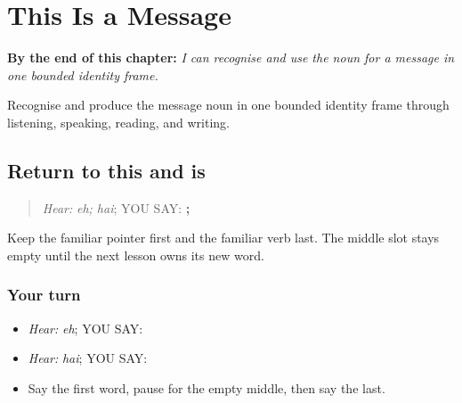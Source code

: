 
\chapter{This Is a Message}
\label{ch:pa-a2-suneha}

\begin{chapteropening}
\textbf{By the end of this chapter:} \emph{I can recognise and use the noun for a message in one bounded identity frame.}

Recognise and produce the message noun in one bounded identity frame through listening, speaking, reading, and writing.
\end{chapteropening}

\section[\texorpdfstring{\pa{ਇਹ} · \pa{ਹੈ} (eh; hai)}{ਇਹ · ਹੈ (eh; hai)}]{Return to this and is}

\label{lesson:PA-C198-message-return}



\begin{quote}
\emph{Hear:} \emph{eh; hai}; YOU SAY: \textbf{; }
\end{quote}

\begin{grammarlens}[title={Grammar Lens}]
Keep the familiar pointer first and the familiar verb last. The middle slot stays empty until the next lesson owns its new word.
\end{grammarlens}

\subsection*{Your turn}
\begin{itemize}
\raggedright
  \item \emph{Hear:} \emph{eh}; YOU SAY: \textbf{}
  \item \emph{Hear:} \emph{hai}; YOU SAY: \textbf{}
  \item Say the first word, pause for the empty middle, then say the last.
\end{itemize}

